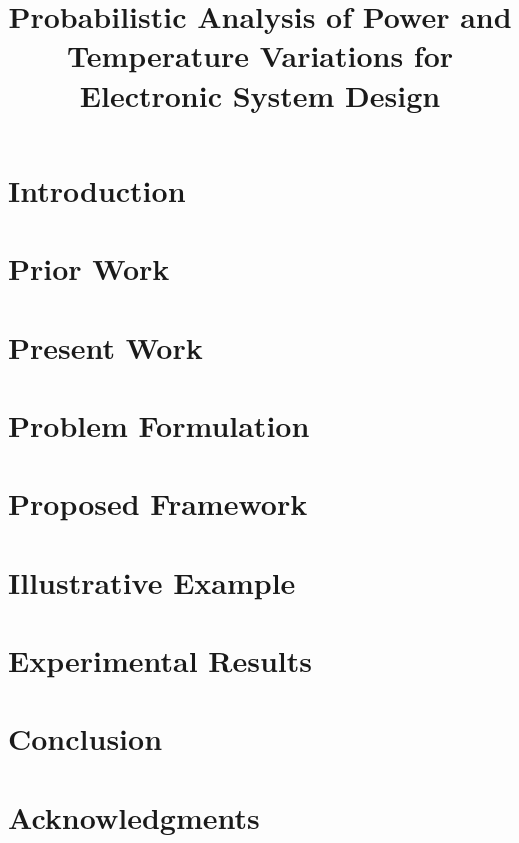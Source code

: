 \documentclass[journal]{IEEEtran}
\begin{document}
  \title{Probabilistic Analysis of Power and Temperature Variations for Electronic System Design}

  \author{
    
  }

  \maketitle

  \begin{abstract}
    
  \end{abstract}

  \section{Introduction} 
  

  \section{Prior Work} 
  

  \section{Present Work} 
  

  \section{Problem Formulation} 
  

  \section{Proposed Framework} 
  

  \section{Illustrative Example} 
  

  \section{Experimental Results} 
  

  \section{Conclusion} 
  

  \section*{Acknowledgments}
  

  \begingroup
  \setlength\bibitemsep{2pt}
  \printbibliography
  \endgroup

  \appendix
  
\end{document}

